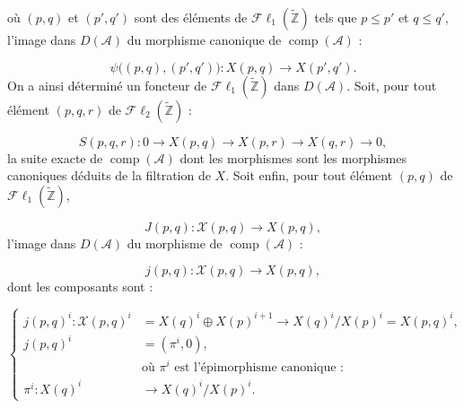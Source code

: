 \clearpage
{}%
\begingroup\small\setlength{\parskip}{0pt}\setlength{\emergencystretch}{1.5em}
\setlength{\abovedisplayskip}{4pt plus 2pt minus 2pt}%
\setlength{\belowdisplayskip}{4pt plus 2pt minus 2pt}%

\noindent où $(p,q)$ et $(p',q')$ sont des éléments de
$\mathcal{F}\ell_1(\widetilde{\mathbb Z})$ tels que $p\leq p'$ et
$q\leq q'$, l'image dans $D(\mathcal A)$ du morphisme canonique de
$\operatorname{comp}(\mathcal A)$ :

\begin{equation}
\psi\bigl((p,q),(p',q')\bigr)\colon
X(p,q)\longrightarrow X(p',q').
\tag{4.2.2.3}
\end{equation}
On a ainsi déterminé un foncteur de
$\mathcal{F}\ell_1(\widetilde{\mathbb Z})$ dans $D(\mathcal A)$. Soit,
pour tout élément $(p,q,r)$ de
$\mathcal{F}\ell_2(\widetilde{\mathbb Z})$ :

\begin{equation}
S(p,q,r)\colon
0\longrightarrow X(p,q)\longrightarrow X(p,r)
\longrightarrow X(q,r)\longrightarrow0,
\tag{4.2.2.4}
\end{equation}
la suite exacte de $\operatorname{comp}(\mathcal A)$ dont les morphismes
sont les morphismes canoniques déduits de la filtration de $X$. Soit enfin,
pour tout élément $(p,q)$ de
$\mathcal{F}\ell_1(\widetilde{\mathbb Z})$,

\begin{equation}
J(p,q)\colon\mathcal X(p,q)\longrightarrow X(p,q),
\tag{4.2.2.5}
\end{equation}
l'image dans $D(\mathcal A)$ du morphisme de
$\operatorname{comp}(\mathcal A)$ :

\begin{equation}
j(p,q)\colon\mathcal X(p,q)\longrightarrow X(p,q),
\tag{4.2.2.6}
\end{equation}
dont les composants sont :

\begin{equation}
\left\{
\begin{aligned}
j(p,q)^i\colon\mathcal X(p,q)^i
 &=X(q)^i\oplus X(p)^{i+1}
   \longrightarrow X(q)^i/X(p)^i=X(p,q)^i,\\
j(p,q)^i&=(\pi^i,0),\\
&\text{où $\pi^i$ est l'épimorphisme canonique :}\\
\pi^i\colon X(q)^i&\longrightarrow X(q)^i/X(p)^i.
\end{aligned}
\right.
\tag{4.2.2.7}
\end{equation}

